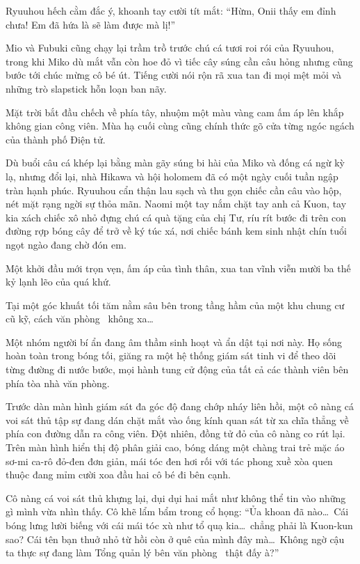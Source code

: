\documentclass[../main.tex]{subfiles}
\begin{document}
Ryuuhou hếch cằm đắc ý, khoanh tay cười tít mắt: ``Hừm, Onii thấy em đỉnh chưa! Em đã hứa là sẽ làm được mà lị!''

Mio và Fubuki cũng chạy lại trầm trồ trước chú cá tươi roi rói của Ryuuhou, trong khi Miko dù mắt vẫn còn hoe đỏ vì tiếc cây súng cần câu hỏng nhưng cũng bước tới chúc mừng cô bé út. Tiếng cười nói rộn rã xua tan đi mọi mệt mỏi và những trò slapstick hỗn loạn ban nãy.

Mặt trời bắt đầu chếch về phía tây, nhuộm một màu vàng cam ấm áp lên khắp không gian công viên. Mùa hạ cuối cùng cũng chính thức gõ cửa từng ngóc ngách của thành phố Điện tử.

Dù buổi câu cá khép lại bằng màn gãy súng bi hài của Miko và đống cá ngừ kỳ lạ, nhưng đổi lại, nhà Hikawa và hội holomem đã có một ngày cuối tuần ngập tràn hạnh phúc. Ryuuhou cẩn thận lau sạch và thu gọn chiếc cần câu vào hộp, nét mặt rạng ngời sự thỏa mãn. Naomi một tay nắm chặt tay anh cả Kuon, tay kia xách chiếc xô nhỏ đựng chú cá quà tặng của chị Tư, ríu rít bước đi trên con đường rợp bóng cây để trở về ký túc xá, nơi chiếc bánh kem sinh nhật chín tuổi ngọt ngào đang chờ đón em.

Một khởi đầu mới trọn vẹn, ấm áp của tình thân, xua tan vĩnh viễn mười ba thế kỷ lạnh lẽo của quá khứ.

\il

Tại một góc khuất tối tăm nằm sâu bên trong tầng hầm của một khu chung cư cũ kỹ, cách văn phòng \hll\ không xa\dots

Một nhóm người bí ẩn đang âm thầm sinh hoạt và ẩn dật tại nơi này. Họ sống hoàn toàn trong bóng tối, giăng ra một hệ thống giám sát tinh vi để theo dõi từng đường đi nước bước, mọi hành tung cử động của tất cả các thành viên bên phía tòa nhà văn phòng.

Trước dàn màn hình giám sát đa góc độ đang chớp nháy liên hồi, một cô nàng cá voi sát thủ tập sự đang dán chặt mắt vào ống kính quan sát từ xa chĩa thẳng về phía con đường dẫn ra công viên. Đột nhiên, đồng tử đỏ của cô nàng co rút lại. Trên màn hình hiển thị độ phân giải cao, bóng dáng một chàng trai trẻ mặc áo sơ-mi ca-rô đỏ-đen đơn giản, mái tóc đen hơi rối với tác phong xuề xòa quen thuộc đang mỉm cười xoa đầu hai cô bé đi bên cạnh.

Cô nàng cá voi sát thủ khựng lại, dụi dụi hai mắt như không thể tin vào những gì mình vừa nhìn thấy. Cô khẽ lẩm bẩm trong cổ họng: ``Ủa khoan đã nào\dots\ Cái bóng lưng lười biếng với cái mái tóc xù như tổ quạ kia\dots\ chẳng phải là Kuon-kun sao? Cái tên bạn thuở nhỏ từ hồi còn ở quê của mình đây mà\dots\ Không ngờ cậu ta thực sự đang làm Tổng quản lý bên văn phòng \hll\ thật đấy à?''
\end{document}
